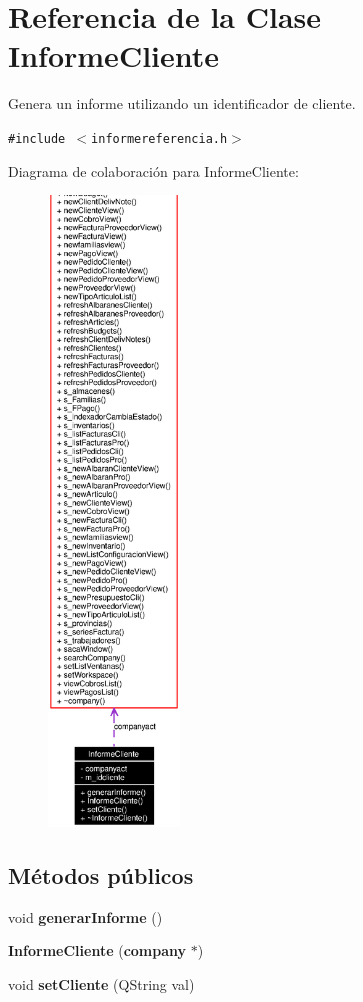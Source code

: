 \section{Referencia de la Clase Informe\-Cliente}
\label{classInformeCliente}
Genera un informe utilizando un identificador de cliente.  


{\tt \#include $<$informereferencia.h$>$}

Diagrama de colaboraci\'{o}n para Informe\-Cliente:\begin{figure}[H]
\begin{center}
\leavevmode
\includegraphics[width=99pt]{classInformeCliente__coll__graph}
\end{center}
\end{figure}
\subsection*{M\'{e}todos p\'{u}blicos}
\begin{CompactItemize}
\item 
void {\bf generar\-Informe} ()
\item 
{\bf Informe\-Cliente} ({\bf company} $\ast$)
\item 
void {\bf set\-Cliente} (QString val)\label{classInformeCliente_a2}

\end{CompactItemize}


